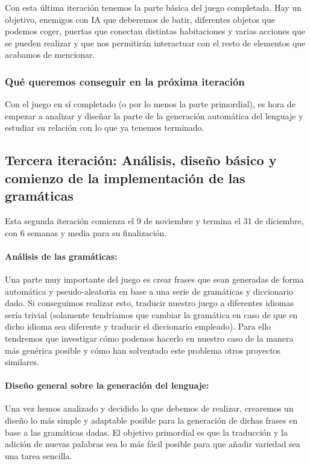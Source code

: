 Con esta última iteración tenemos la parte básica del juego completada. Hay un objetivo, enemigos con IA que deberemos de batir, diferentes objetos que podemos coger, puertas que conectan distintas habitaciones y varias acciones que se pueden realizar y que nos permitirán interactuar con el resto de elementos que acabamos de mencionar.

\subsubsection{Qué queremos conseguir en la próxima iteración}

Con el juego en sí completado (o por lo menos la parte primordial), es hora de empezar a analizar y diseñar la parte de la generación automática del lenguaje y estudiar su relación con lo que ya tenemos terminado.

\subsection{Tercera iteración: Análisis, diseño básico y comienzo de la implementación de las gramáticas}

Esta segunda iteración comienza el 9 de noviembre y termina el 31 de diciembre, con 6 semanas y media para su finalización.

\paragraph{Análisis de las gramáticas:} Una parte muy importante del juego es crear frases que sean generadas de forma automática y pseudo-aleatoria en base a una serie de gramáticas y diccionario dado. Si conseguimos realizar esto, traducir nuestro juego a diferentes idiomas sería trivial (solamente tendríamos que cambiar la gramática en caso de que en dicho idioma sea diferente y traducir el diccionario empleado). Para ello tendremos que investigar cómo podemos hacerlo en nuestro caso de la manera más genérica posible y cómo han solventado este problema otros proyectos similares.

\paragraph{Diseño general sobre la generación del lenguaje:} Una vez hemos analizado y decidido lo que debemos de realizar, crearemos un diseño lo más simple y adaptable posible para la generación de dichas frases en base a las gramáticas dadas. El objetivo primordial es que la traducción y la adición de nuevas palabras sea lo más fácil posible para que añadir variedad sea una tarea sencilla.


